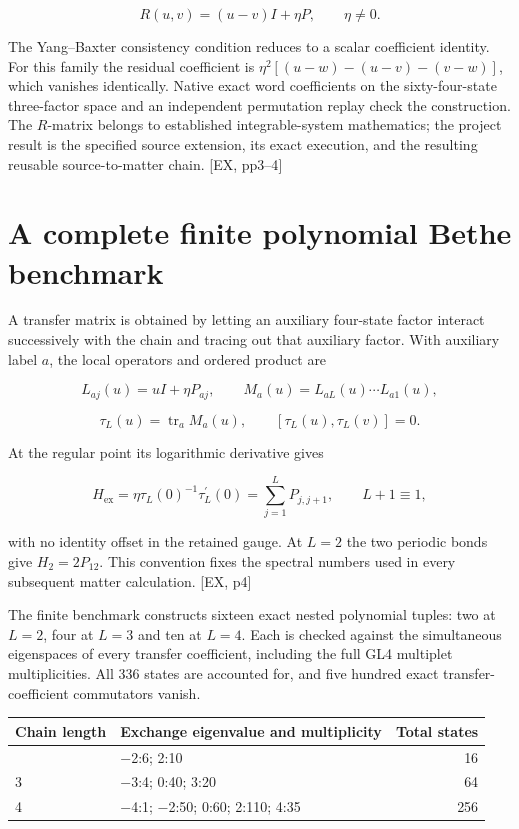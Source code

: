 \[
R(u,v)=(u-v)I+\eta P,\qquad\eta\ne0.
\]

The Yang--Baxter consistency condition reduces to a scalar coefficient identity. For this family the residual coefficient is \(\eta^2[(u-w)-(u-v)-(v-w)]\), which vanishes identically. Native exact word coefficients on the sixty-four-state three-factor space and an independent permutation replay check the construction. The \(R\)-matrix belongs to established integrable-system mathematics; the project result is the specified source extension, its exact execution, and the resulting reusable source-to-matter chain. {[}EX, pp3--4{]}

\section{A complete finite polynomial Bethe benchmark}\label{a-complete-finite-polynomial-bethe-benchmark}

A transfer matrix is obtained by letting an auxiliary four-state factor interact successively with the chain and tracing out that auxiliary factor. With auxiliary label \(a\), the local operators and ordered product are

\[
L_{aj}(u)=uI+\eta P_{aj},\qquad M_a(u)=L_{aL}(u)\cdots L_{a1}(u),
\]

\[
\tau_L(u)=\operatorname{tr}_a M_a(u),\qquad[\tau_L(u),\tau_L(v)]=0.
\]

At the regular point its logarithmic derivative gives

\[
H_{\mathrm{ex}}=\eta\tau_L(0)^{-1}\tau_L^{\prime}(0)=\sum_{j=1}^{L}P_{j,j+1},\qquad L+1\equiv1,
\]

with no identity offset in the retained gauge. At \(L=2\) the two periodic bonds give \(H_2=2P_{12}\). This convention fixes the spectral numbers used in every subsequent matter calculation. {[}EX, p4{]}

The finite benchmark constructs sixteen exact nested polynomial tuples: two at \(L=2\), four at \(L=3\) and ten at \(L=4\). Each is checked against the simultaneous eigenspaces of every transfer coefficient, including the full GL4 multiplet multiplicities. All 336 states are accounted for, and five hundred exact transfer-coefficient commutators vanish.

\begin{longtable}[]{@{}llr@{}}
\toprule\noalign{}
Chain length & Exchange eigenvalue and multiplicity & Total states \\
\midrule\noalign{}
\endhead
\bottomrule\noalign{}
\endlastfoot
2 & −2:6; 2:10 & 16 \\
3 & −3:4; 0:40; 3:20 & 64 \\
4 & −4:1; −2:50; 0:60; 2:110; 4:35 & 256 \\
\end{longtable}

